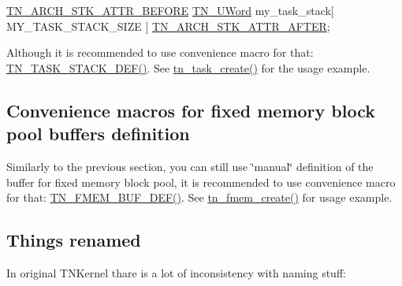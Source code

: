 \begin{DoxyCode}
\hyperlink{tn__arch__example_8h_ae245dddb19cd7c12b7038a62d576fafa}{TN\_ARCH\_STK\_ATTR\_BEFORE}
\hyperlink{tn__arch__example_8h_ab80cba0fe9ffcd9011d53dfeb9e39bf4}{TN\_UWord} my\_task\_stack[ MY\_TASK\_STACK\_SIZE ]
\hyperlink{tn__arch__example_8h_ab082613959b539182b8b47bc87d18d6a}{TN\_ARCH\_STK\_ATTR\_AFTER};
\end{DoxyCode}


Although it is recommended to use convenience macro for that\+: {\ttfamily \hyperlink{tn__tasks_8h_a120e01d9dddd21ac11827595e88d7c36}{T\+N\+\_\+\+T\+A\+S\+K\+\_\+\+S\+T\+A\+C\+K\+\_\+\+D\+E\+F()}}. See {\ttfamily \hyperlink{tn__tasks_8h_a548d5adda09d1b4e393b5df0e9e1a7a5}{tn\+\_\+task\+\_\+create()}} for the usage example.\hypertarget{tnkernel_diff_tnkernel_new_api__convenience_macros_fmem}{}\subsection{Convenience macros for fixed memory block pool buffers definition}\label{tnkernel_diff_tnkernel_new_api__convenience_macros_fmem}
Similarly to the previous section, you can still use \char`\"{}manual\char`\"{} definition of the buffer for fixed memory block pool, it is recommended to use convenience macro for that\+: {\ttfamily \hyperlink{tn__fmem_8h_ab45e9c2ad4a64345214f9a912bf76fc3}{T\+N\+\_\+\+F\+M\+E\+M\+\_\+\+B\+U\+F\+\_\+\+D\+E\+F()}}. See {\ttfamily \hyperlink{tn__fmem_8h_a56d47d4a1b6453d959336448a0ce96ac}{tn\+\_\+fmem\+\_\+create()}} for usage example.\hypertarget{tnkernel_diff_tnkernel_diff_api_rename}{}\subsection{Things renamed}\label{tnkernel_diff_tnkernel_diff_api_rename}
In original T\+N\+Kernel thare is a lot of inconsistency with naming stuff\+:


